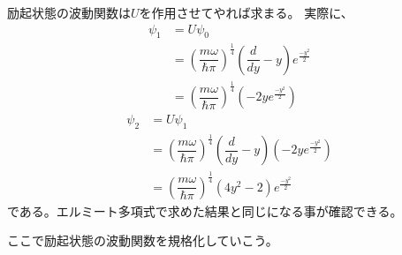 励起状態の波動関数は$U$を作用させてやれば求まる。
実際に、
\begin{align}
	\psi_1 &= U\psi_0 \\
				 &= \left( \dfrac{m\omega}{\hbar\pi} \right)^\frac{1}{4}\left(\dfrac{d}{dy} - y\right)e^{\frac{-y^2}{2}} \\
				 &= \left( \dfrac{m\omega}{\hbar\pi} \right)^\frac{1}{4}\left( -2ye^{\frac{-y^2}{2}} \right)
\end{align}
\begin{align}
	\psi_2 &= U\psi_1 \\
				 &= \left( \dfrac{m\omega}{\hbar\pi} \right)^\frac{1}{4}\left(\dfrac{d}{dy} - y\right)\left( -2ye^{\frac{-y^2}{2}} \right) \\
				 &= \left( \dfrac{m\omega}{\hbar\pi} \right)^\frac{1}{4}\left( 4y^2 -2 \right)e^{\frac{-y^2}{2}}
\end{align}
である。エルミート多項式で求めた結果と同じになる事が確認できる。

ここで励起状態の波動関数を規格化していこう。

